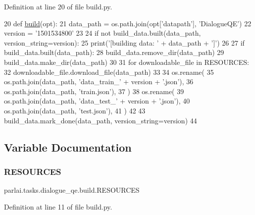 Definition at line 20 of file build.\+py.


\begin{DoxyCode}
20 \textcolor{keyword}{def }\hyperlink{namespacedialog__babi__feedback_1_1build_a7a9d289f7493a5ded13c4b7f071b6184}{build}(opt):
21     data\_path = os.path.join(opt[\textcolor{stringliteral}{'datapath'}], \textcolor{stringliteral}{'DialogueQE'})
22     version = \textcolor{stringliteral}{'1501534800'}
23 
24     \textcolor{keywordflow}{if} \textcolor{keywordflow}{not} build\_data.built(data\_path, version\_string=version):
25         print(\textcolor{stringliteral}{'[building data: '} + data\_path + \textcolor{stringliteral}{']'})
26 
27         \textcolor{keywordflow}{if} build\_data.built(data\_path):
28             build\_data.remove\_dir(data\_path)
29         build\_data.make\_dir(data\_path)
30 
31         \textcolor{keywordflow}{for} downloadable\_file \textcolor{keywordflow}{in} RESOURCES:
32             downloadable\_file.download\_file(data\_path)
33 
34         os.rename(
35             os.path.join(data\_path, \textcolor{stringliteral}{'data\_train\_'} + version + \textcolor{stringliteral}{'.json'}),
36             os.path.join(data\_path, \textcolor{stringliteral}{'train.json'}),
37         )
38         os.rename(
39             os.path.join(data\_path, \textcolor{stringliteral}{'data\_test\_'} + version + \textcolor{stringliteral}{'.json'}),
40             os.path.join(data\_path, \textcolor{stringliteral}{'test.json'}),
41         )
42 
43         build\_data.mark\_done(data\_path, version\_string=version)
44 \end{DoxyCode}


\subsection{Variable Documentation}
\mbox{\label{namespaceparlai_1_1tasks_1_1dialogue__qe_1_1build_a2a8edddb578c61b781b577f9c8d2d712}} 
\subsubsection{\texorpdfstring{R\+E\+S\+O\+U\+R\+C\+ES}{RESOURCES}}
{\footnotesize\ttfamily parlai.\+tasks.\+dialogue\+\_\+qe.\+build.\+R\+E\+S\+O\+U\+R\+C\+ES}



Definition at line 11 of file build.\+py.

